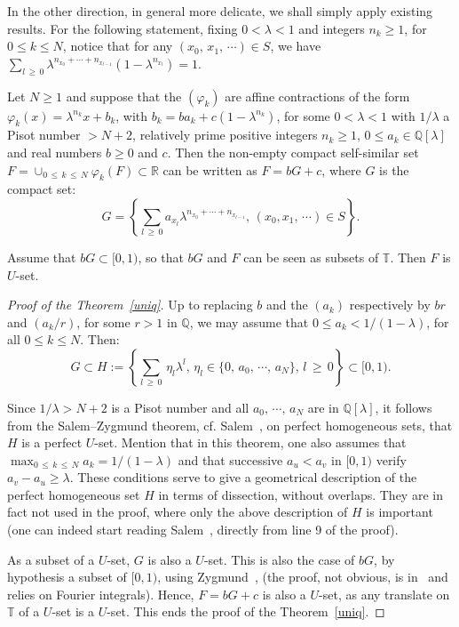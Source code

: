\documentclass[AHL,Unicode,longabstracts,published]{cedram}
\newcommand{\Tbb}{\mathbb T}
\newcommand{\Rbb}{\mathbb R}
\newcommand{\Qbb}{\mathbb Q}
\begin{document}
In the other direction, in general more delicate, we shall simply apply existing results. For the following statement, fixing $0<\lambda<1$ and integers $n_k\geq 1$, for $0\leq k\leq N$, notice that for any $(x_0,\,x_1,\,\cdots)\in S$, we have $\sum_{l\,\geq\,0}\lambda^{n_{x_0}+\cdots+n_{x_{l-1}}}(1-\lambda^{n_{x_l}})=1$.


\begin{theo}\label{uniq}
Let $N\geq1$ and suppose that the $(\varphi_k)$ are affine contractions of the form $\varphi_k(x)=\lambda^{n_k}x+b_k$, with $b_k=ba_k+c(1-\lambda^{n_k})$, for some $0<\lambda<1$ with $1/\lambda$ a Pisot number $>N+2$, relatively prime positive integers $n_k\geq1$, $0\leq a_k\in\Qbb[\lambda]$ and real numbers $b\geq0$ and $c$. Then the non-empty compact self-similar set $F=\cup_{0\,\leq\,k\,\leq\,N}\varphi_k(F)\subset\Rbb$ can be written as $F=bG+c$, where $G$ is the compact set:
\[
G=\left\{{\sum_{l\,\geq\,0}a_{x_l}\lambda^{n_{x_0}+\cdots+n_{x_{l-1}}},\,(x_0,x_1,\,\cdots)\in S}\right\}.
\]

Assume that $bG\subset[0,1)$, so that $bG$ and $F$ can be seen as subsets of $\Tbb$. Then $F$ is $U$-set.
\end{theo}


\begin{proof}[{Proof of the Theorem~\ref{uniq}}]
Up to replacing $b$ and the $(a_k)$ respectively by $br$ and $(a_k/r)$, for some $r>1$ in $\Qbb$, we may assume that $0\leq a_k<1/(1-\lambda)$, for all $0\leq k\leq N$. Then:
\[
G\subset H:=\left\{{\sum_{l\,\geq\,0}\,\eta_l\lambda^l,\,\eta_l\in\{0,\,a_0,\,\cdots,\,a_N\},\,l\,\geq\,0}\right\}\subset[0,1).
\]

Since $1/\lambda>N+2$ is a Pisot number and all $a_0,\,\cdots,\,a_N$ are in $\Qbb[\lambda]$, it follows from the Salem--Zygmund theorem, cf. Salem~\cite[Chapter~VII, Paragraph~3]{salem2}, on perfect homogeneous sets, that $H$ is a perfect $U$-set. Mention that in this theorem, one also assumes that $\max_{0\,\leq\,k\,\leq\,N}a_k=1/(1-\lambda)$ and that successive $a_u<a_v$ in $[0,1)$ verify $a_v-a_u\geq \lambda$. These conditions serve to give a geometrical description of the perfect homogeneous set $H$ in terms of dissection, without overlaps. They are in fact not used in the proof, where only the above description of $H$ is important (one can indeed start reading Salem~\cite[Chapter~VII, Paragraph~3]{salem2}, directly from line 9 of the proof).

As a subset of a $U$-set, $G$ is also a $U$-set. This is also the case of $bG$, by hypothesis a subset of $[0,1)$, using Zygmund~\cite[Vol. I, Chapter~IX, Theorem~6.18]{zyg}, (the proof, not obvious, is in~\cite[Vol. II, Chapter~XVI, 10.25]{zyg} and relies on Fourier integrals). Hence, $F=bG+c$ is also a $U$-set, as any translate on $\Tbb$ of a $U$-set is a $U$-set. This ends the proof of the Theorem~\ref{uniq}.
\end{proof}
\end{document}

